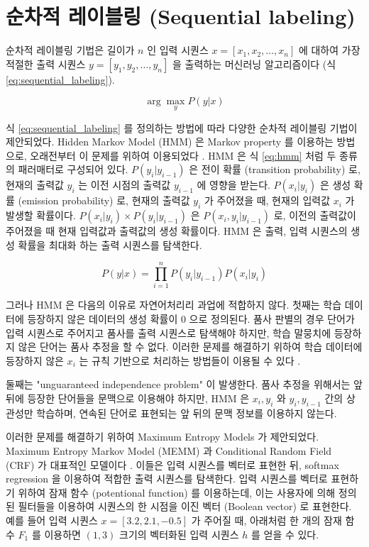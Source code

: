 \documentclass[oneside, ko,phd]{snuthesis_utf8_kor}
\begin{document}
\section{순차적 레이블링 (Sequential labeling)}

순차적 레이블링 기법은 길이가 $n$ 인 입력 시퀀스 $x = [x_1, x_2, \dots, x_n]$ 에 대하여 가장 적절한 출력 시퀀스 $y = [y_1, y_2, \dots, y_n]$ 을 출력하는 머신러닝 알고리즘이다 (식 \ref{eq:sequential_labeling}).

\begin{equation}
  \label{eq:sequential_labeling}
  \arg \max_y P(y \vert x)
\end{equation}

식 \ref{eq:sequential_labeling} 를 정의하는 방법에 따라 다양한 순차적 레이블링 기법이 제안되었다.
Hidden Markov Model (HMM) 은 Markov property 를 이용하는 방법으로, 오래전부터 이 문제를 위하여 이용되었다 \cite{krogh1994hidden}.
HMM 은 식 \ref{eq:hmm} 처럼 두 종류의 패러매터로 구성되어 있다.
$P(y_i \vert y_{i-1})$ 은 전이 확률 (transition probability) 로, 현재의 출력값 $y_i$ 는 이전 시점의 출력값 $y_{i-1}$ 에 영향을 받는다.
$P(x_i \vert y_i)$ 은 생성 확률 (emission probability) 로, 현재의 출력값 $y_i$ 가 주어졌을 때, 현재의 입력값 $x_i$ 가 발생할 확률이다.
$P(x_i \vert y_i) \times P(y_i \vert y_{i-1})$ 은 $P(x_i, y_i \vert y_{i-1})$ 로, 이전의 출력값이 주어졌을 때 현재 입력값과 출력값의 생성 확률이다.
HMM 은 출력, 입력 시퀀스의 생성 확률을 최대화 하는 출력 시퀀스를 탐색한다.

\begin{equation}
  \label{eq:hmm}
  P(y \vert x) = \prod_{i=1}^{n} P(y_i \vert y_{i-1}) P(x_i \vert y_i)
\end{equation}

그러나 HMM 은 다음의 이유로 자연어처리리 과업에 적합하지 않다.
첫째는 학습 데이터에 등장하지 않은 데이터의 생성 확률이 0 으로 정의된다.
품사 판별의 경우 단어가 입력 시퀀스로 주어지고 품사를 출력 시퀀스로 탐색해야 하지만, 학습 말뭉치에 등장하지 않은 단어는 품사 추정을 할 수 없다.
이러한 문제를 해결하기 위하여 학습 데이터에 등장하지 않은 $x_i$ 는 규칙 기반으로 처리하는 방법들이 이용될 수 있다 \cite{brants2000tnt}.

둘째는 "unguaranteed independence problem" 이 발생한다.
품사 추정을 위해서는 앞 뒤에 등장한 단어들을 문맥으로 이용해야 하지만, HMM 은 $x_i, y_i$ 와 $y_i, y_{i-1}$ 간의 상관성만 학습하며, 연속된 단어로 표현되는 앞 뒤의 문맥 정보를 이용하지 않는다.

이러한 문제를 해결하기 위하여 Maximum Entropy Models 가 제안되었다.
Maximum Entropy Markov Model (MEMM) 과 Conditional Random Field (CRF) 가 대표적인 모델이다 \cite{mccallum2000maximum, lafferty2001conditional}.
이들은 입력 시퀀스를 벡터로 표현한 뒤, softmax regression 을 이용하여 적합한 출력 시퀀스를 탐색한다.
입력 시퀀스를 벡터로 표현하기 위하여 잠재 함수 (potentional function) 를 이용하는데, 이는 사용자에 의해 정의된 필터들을 이용하여 시퀀스의 한 시점을 이진 벡터 (Boolean vector) 로 표현한다.
예를 들어 입력 시퀀스 $x=[3.2, 2.1, -0.5]$ 가 주어질 때, 아래처럼 한 개의 잠재 함수 $F_1$ 를 이용하면 $(1, 3)$ 크기의 벡터화된 입력 시퀀스 $h$ 를 얻을 수 있다.
\end{document}
